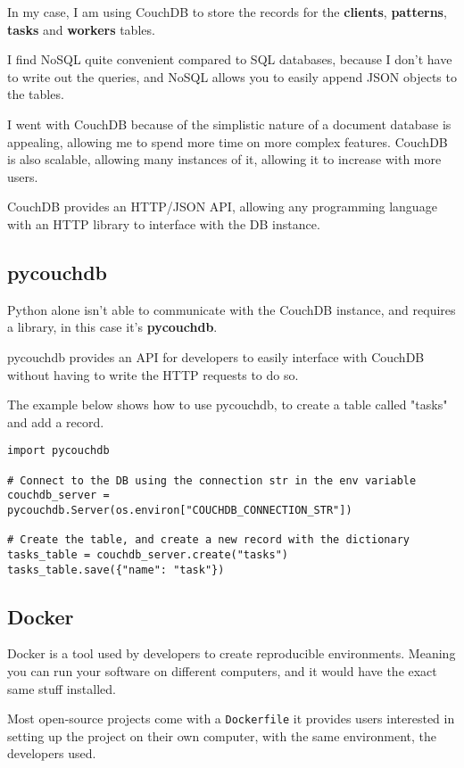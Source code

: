 In my case, I am using CouchDB to store the records for the
\textbf{clients}, \textbf{patterns}, \textbf{tasks} and \textbf{workers} tables.

I find NoSQL quite convenient compared to SQL databases,
because I don't have to write out the queries,
and NoSQL allows you to easily append JSON objects to the tables.

I went with CouchDB because of the simplistic nature of
a document database is appealing,
allowing me to spend more time on more complex features.
CouchDB is also scalable, allowing many instances of it,
allowing it to increase with more users.

CouchDB provides an HTTP/JSON API, allowing any programming language
with an HTTP library to interface with the DB instance.

\subsection{pycouchdb}
Python alone isn't able to communicate with the CouchDB instance,
and requires a library, in this case it's \textbf{pycouchdb}.

pycouchdb provides an API for developers to easily interface with
CouchDB without having to write the HTTP requests to do so.

The example below shows how to use pycouchdb,
to create a table called "tasks" and add a record.

\begin{lstlisting}
import pycouchdb

# Connect to the DB using the connection str in the env variable
couchdb_server = pycouchdb.Server(os.environ["COUCHDB_CONNECTION_STR"])

# Create the table, and create a new record with the dictionary
tasks_table = couchdb_server.create("tasks")
tasks_table.save({"name": "task"})
\end{lstlisting}


\subsection{Docker}
Docker is a tool used by developers to create reproducible environments.
Meaning you can run your software on different computers,
and it would have the exact same stuff installed.

Most open-source projects come with a \texttt{Dockerfile} it provides
users interested in setting up the project on their own computer,
with the same environment, the developers used.

